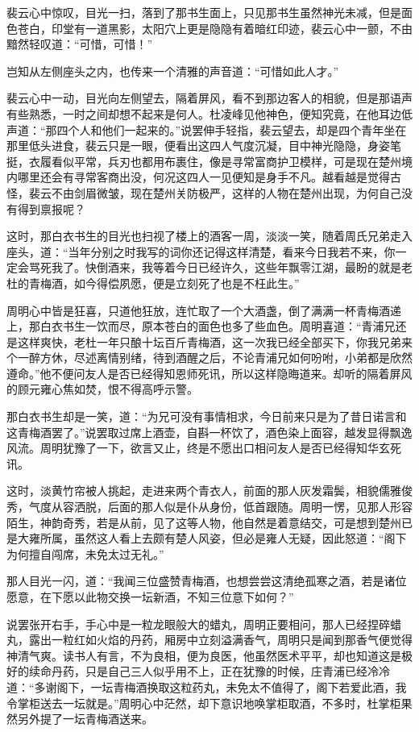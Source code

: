 裴云心中惊叹，目光一扫，落到了那书生面上，只见那书生虽然神光未减，但是面色苍白，印堂有一道黑影，太阳穴上更是隐隐有着暗红印迹，裴云心中一颤，不由黯然轻叹道：“可惜，可惜！”

岂知从左侧座头之内，也传来一个清雅的声音道：“可惜如此人才。”

裴云心中一动，目光向左侧望去，隔着屏风，看不到那边客人的相貌，但是那语声有些熟悉，一时之间却想不起来是何人。杜凌峰见他神色，便知究竟，在他耳边低声道：“那四个人和他们一起来的。”说罢伸手轻指，裴云望去，却是四个青年坐在那里低头进食，裴云只是一眼，便看出这四人气度沉凝，目中神光隐隐，身姿笔挺，衣履看似平常，兵刃也都用布裹住，像是寻常富商护卫模样，可是现在楚州境内哪里还会有寻常客商出没，何况这四人一见便知是身手不凡。越看越是觉得古怪，裴云不由剑眉微皱，现在楚州关防极严，这样的人物在楚州出现，为何自己没有得到禀报呢？

这时，那白衣书生的目光也扫视了楼上的酒客一周，淡淡一笑，随着周氏兄弟走入座头，道：“当年分别之时我写的词你还记得这样清楚，看来今日我若不来，你一定会骂死我了。快倒酒来，我等着今日已经许久，这些年飘零江湖，最盼的就是老杜的青梅酒，如今得偿夙愿，便是立刻死了也是不枉此生。”

周明心中皆是狂喜，只道他狂放，连忙取了一个大酒盏，倒了满满一杯青梅酒递上，那白衣书生一饮而尽，原本苍白的面色也多了些血色。周明喜道：“青浦兄还是这样爽快，老杜一年只酿十坛百斤青梅酒，这一次我已经全部买下，你我兄弟来个一醉方休，尽述离情别绪，待到酒醒之后，不论青浦兄如何吩咐，小弟都是欣然遵命。”他不便问友人是否已经得知恩师死讯，所以这样隐晦道来。却听的隔着屏风的顾元雍心焦如焚，恨不得高呼示警。

那白衣书生却是一笑，道：“为兄可没有事情相求，今日前来只是为了昔日诺言和这青梅酒罢了。”说罢取过席上酒壶，自斟一杯饮了，酒色染上面容，越发显得飘逸风流。周明犹豫了一下，欲言又止，终是不愿出口相问友人是否已经得知华玄死讯。

这时，淡黄竹帘被人挑起，走进来两个青衣人，前面的那人灰发霜鬓，相貌儒雅俊秀，气度从容洒脱，后面的那人似是仆从身份，低首跟随。周明一愣，见那人形容陌生，神韵奇秀，若是从前，见了这等人物，他自然是着意结交，可是想到楚州已是大雍所属，虽然这人看上去颇有楚人风姿，但必是雍人无疑，因此怒道：“阁下为何擅自闯席，未免太过无礼。”

那人目光一闪，道：“我闻三位盛赞青梅酒，也想尝尝这清绝孤寒之酒，若是诸位愿意，在下愿以此物交换一坛新酒，不知三位意下如何？”

说罢张开右手，手心中是一粒龙眼般大的蜡丸，周明正要相问，那人已经捏碎蜡丸，露出一粒红如火焰的丹药，厢房中立刻溢满香气，周明只是闻到那香气便觉得神清气爽。读书人有言，不为良相，便为良医，他虽然医术平平，却也知道这是极好的续命丹药，只是自己三人似乎用不上，正在犹豫的时候，庄青浦已经冷冷道：“多谢阁下，一坛青梅酒换取这粒药丸，未免太不值得了，阁下若爱此酒，我令掌柜送去一坛就是。”周明心中茫然，却下意识地唤掌柜取酒，不多时，杜掌柜果然另外提了一坛青梅酒送来。

